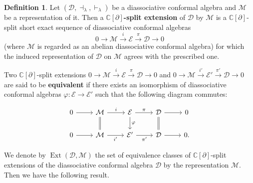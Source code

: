 \documentclass[a4paper,reqno,10pt]{amsart}
\theoremstyle{plain}
\theoremstyle{definition}
\newtheorem{definition}[thm]{Definition}
\theoremstyle{remark}
\renewcommand{\ker}{\operatorname{Ker}}
\newcommand{\C}{\mathbb{C}}
\newcommand{\D}{\mathcal{D}}
\newcommand{\M}{\mathcal{M}}
\newcommand{\E}{\mathcal{E}}
\newcommand{\p}{\partial}
\newcommand{\la}{\lambda}
\begin{document}

\begin{definition}
Let $(\D,\dashv_{\la},\vdash_{\la})$ be a diassociative conformal algebra and $\M$ be a representation of it. Then a {\bf $\mathbb{C}[\partial]$-split extension} of $\D$ by $\M$ is a $\mathbb{C}[\partial]$-split short exact sequence of diassociative conformal algebras
\[
0\longrightarrow
\M
\xrightarrow{\ i \ }
\E
\xrightarrow{\ \pi\ }
\D
\longrightarrow 0
\]
(where $\M$ is regarded as an abelian diassociative conformal algebra) for which the induced representation of $\D$ on $\M$ agrees with the prescribed one.
\end{definition}
Two $\C[\p]$-split extensions $0 \longrightarrow \M
\xrightarrow{\ i \ } \E
\xrightarrow{\ \pi \ } \D
\longrightarrow 0$ and $
0 \longrightarrow \M
\xrightarrow{\ i' \ } \E'
\xrightarrow{\ \pi' \ } \D
\longrightarrow 0
$ are said to be {\bf equivalent} if there exists an isomorphism of diassociative conformal algebras $\varphi:  \E\longrightarrow\E'$ such that the following diagram commutes: 

\[
\begin{tikzcd}
0 \arrow[r] &
\M \arrow[r,"i"] \arrow[d,equals] &
\E \arrow[r,"\pi"] \arrow[d,"\varphi"] &
\D \arrow[r] \arrow[d,equals] &
0\\
0 \arrow[r] &
\M \arrow[r,"i'"'] &
\E' \arrow[r,"\pi'"'] &
\D \arrow[r] &
0.
\end{tikzcd}
\]

\medskip

\noindent We denote by $\operatorname{Ext}(\D,\M)$ the set of equivalence classes of $\C[\p]$-split extensions of the diassociative conformal algebra $\D$ by the representation $\M$. Then we have the following result.
\end{document}
